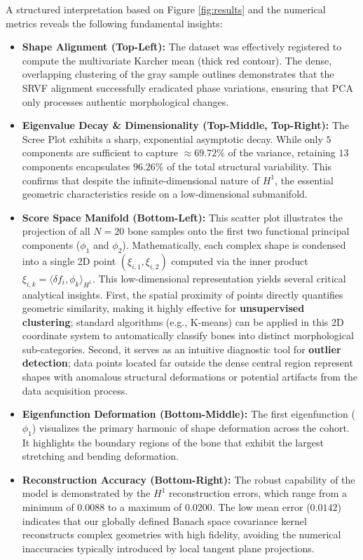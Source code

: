 \documentclass[twoside]{article}
\begin{document}
A structured interpretation based on Figure \ref{fig:results} and the numerical metrics reveals the following fundamental insights:
\begin{itemize}
    \item \textbf{Shape Alignment (Top-Left):} The dataset was effectively registered to compute the multivariate Karcher mean (thick red contour). The dense, overlapping clustering of the gray sample outlines demonstrates that the SRVF alignment successfully eradicated phase variations, ensuring that PCA only processes authentic morphological changes.
    
    \item \textbf{Eigenvalue Decay \& Dimensionality (Top-Middle, Top-Right):} The Scree Plot exhibits a sharp, exponential asymptotic decay. While only $5$ components are sufficient to capture $\approx 69.72\%$ of the variance, retaining $13$ components encapsulates $96.26\%$ of the total structural variability. This confirms that despite the infinite-dimensional nature of $H^1$, the essential geometric characteristics reside on a low-dimensional submanifold.
    
    \item \textbf{Score Space Manifold (Bottom-Left):} This scatter plot illustrates the projection of all $N=20$ bone samples onto the first two functional principal components ($\phi_1$ and $\phi_2$). Mathematically, each complex shape is condensed into a single 2D point $(\xi_{i,1}, \xi_{i,2})$ computed via the inner product $\xi_{i,k} = \langle \delta f_i, \phi_k \rangle_{H^1}$. This low-dimensional representation yields several critical analytical insights. First, the spatial proximity of points directly quantifies geometric similarity, making it highly effective for \textbf{unsupervised clustering}; standard algorithms (e.g., K-means) can be applied in this 2D coordinate system to automatically classify bones into distinct morphological sub-categories. Second, it serves as an intuitive diagnostic tool for \textbf{outlier detection}; data points located far outside the dense central region represent shapes with anomalous structural deformations or potential artifacts from the data acquisition process.

    \item \textbf{Eigenfunction Deformation (Bottom-Middle):} The first eigenfunction ($\phi_1$) visualizes the primary harmonic of shape deformation across the cohort. It highlights the boundary regions of the bone that exhibit the largest stretching and bending deformation.

    \item \textbf{Reconstruction Accuracy (Bottom-Right):} The robust capability of the model is demonstrated by the $H^1$ reconstruction errors, which range from a minimum of $0.0088$ to a maximum of $0.0200$. 
The low mean error ($0.0142$) indicates that our globally defined Banach space covariance kernel 
reconstructs complex geometries with high fidelity, avoiding the numerical inaccuracies 
typically introduced by local tangent plane projections.

\end{itemize}
\end{document}
